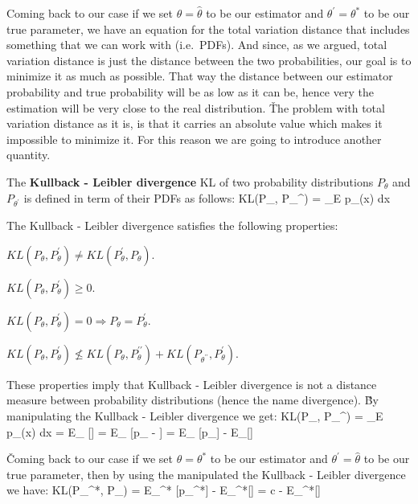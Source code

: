 Coming back to our case if we set $\theta = \hat{\theta}$ to be our estimator and $\theta^{\prime} = \theta^{*}$ to
be our true parameter, we have an equation for the total variation distance that includes something that we can work
with (i.e.\ PDFs). And since, as we argued, total variation distance is just the distance between the two
probabilities, our goal is to minimize it as much as possible. That way the distance between our estimator
probability and true probability will be as low as it can be, hence very the estimation will be very close to the
real distribution. \v

The problem with total variation distance as it is, is that it carries an absolute value which makes it impossible to
minimize it. For this reason we are going to introduce another quantity.

The \textbf{Kullback - Leibler divergence} KL of two probability distributions $P_{\theta}$ and $P_{\theta^{\prime}}$
is defined in term of their PDFs as follows:
\bse
KL(P_{\theta}, P_{\theta}^{\prime}) = \int_{E} p_{\theta}(x) \ln {} dx
\ese
\ed

The Kullback - Leibler divergence satisfies the following properties:
\bit
\item $KL(P_{\theta}, P_{\theta}^{\prime}) \neq KL(P_{\theta}^{\prime}, P_{\theta})$.
\item $KL(P_{\theta}, P_{\theta}^{\prime}) \geq 0$.
\item $KL(P_{\theta}, P_{\theta}^{\prime}) =0 \Rightarrow P_{\theta} = P_{\theta}^{\prime}$.
\item $KL(P_{\theta}, P_{\theta}^{\prime}) \nleq KL(P_{\theta}, P_{\theta}^{\prime\prime}) +
KL(P_{\theta^{\prime\prime}}, P_{\theta}^{\prime})$.
\eit

These properties imply that Kullback - Leibler divergence is not a distance measure between probability distributions
(hence the name divergence). \v

By manipulating the Kullback - Leibler divergence we get:
\bse
KL(P_{\theta}, P_{\theta}^{\prime}) = \int_{E} p_{\theta}(x) \ln {} dx =
E_{\theta} [\ln {}] = E_{\theta} [\ln p_{\theta} - ] =
E_{\theta} [\ln p_{\theta}] - E_{\theta}[]
\ese

\v

Coming back to our case if we set $\theta = \theta^{*}$ to be our estimator and $\theta^{\prime} = \hat{\theta}$ to
be our true parameter, then by using the manipulated the Kullback - Leibler divergence we have:
\bse
KL(P_{\theta^{*}}, P_{\hat{\theta}}) = E_{\theta^{*}} [\ln p_{\theta^{*}}] - E_{\theta^{*}}[] =
c - E_{\theta^{*}}[]
\ese

